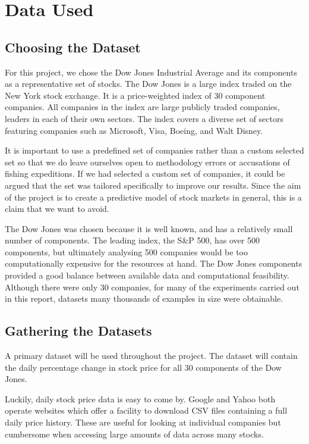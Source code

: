 \documentclass{report}
\begin{document}
\section{Data Used}

\subsection{Choosing the Dataset}

For this project, we chose the Dow Jones Industrial Average and its components as a representative set of stocks. The Dow Jones is a large index traded on the New York stock exchange. It is a price-weighted index of 30 component companies. All companies in the index are large publicly traded companies, leaders in each of their own sectors. The index covers a diverse set of sectors featuring companies such as Microsoft, Visa, Boeing, and Walt Disney.

It is important to use a predefined set of companies rather than a custom selected set so that we do leave ourselves open to methodology errors or accusations of fishing expeditions. If we had selected a custom set of companies, it could be argued that the set was tailored specifically to improve our results. Since the aim of the project is to create a predictive model of stock markets in general, this is a claim that we want to avoid. 

The Dow Jones was chosen because it is well known, and has a relatively small number of components. The leading index, the S\&P 500, has over 500 components, but ultimately analysing 500 companies would be too computationally expensive for the resources at hand. The Dow Jones components provided a good balance between available data and computational feasibility. Although there were only 30 companies,  for many of the experiments carried out in this report, datasets many thousands of examples in size were obtainable.

\subsection{Gathering the Datasets}

A primary dataset will be used throughout the project. The dataset will contain the daily percentage change in stock price for all 30 components of the Dow Jones.

Luckily, daily stock price data is easy to come by. Google and Yahoo both operate websites which offer a facility to download CSV files containing a full daily price history. These are useful for looking at individual companies but cumbersome when accessing large amounts of data across many stocks. 
\end{document}
